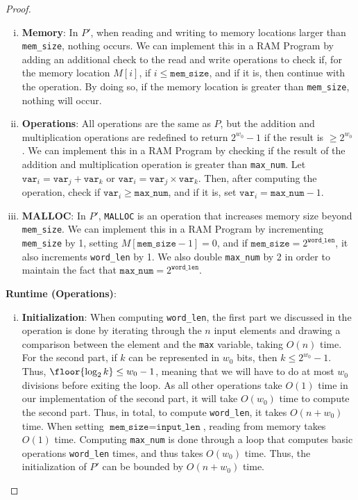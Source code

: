 \documentclass[11pt]{scrartcl}
\theoremstyle{dotlessP}
\theoremstyle{dotlessN}
\begin{document}
\begin{proof}
\begin{enumerate}[(i)]
		\item \textbf{Memory}: In $P'$, when reading and writing to memory locations larger than \texttt{mem\_size}, nothing occurs. We can implement this in a RAM Program by adding an additional check to the read and write operations to check if, for the memory location $M[i]$, if  $i \leq \texttt{mem\_size}$, and if it is, then continue with the operation. By doing so, if the memory location is greater than \texttt{mem\_size}, nothing will occur.
		\item \textbf{Operations}: All operations are the same as $P$, but the addition and multiplication operations are redefined to return $2^{w_0} - 1$ if the result is $\geq 2^{w_0}$. We can implement this in a RAM Program by checking if the result of the addition and multiplication operation is greater than \texttt{max\_num}. Let $\texttt{var}_i = \texttt{var}_j + \texttt{var}_k$ or $\texttt{var}_i = \texttt{var}_j \times \texttt{var}_k$. Then, after computing the operation, check if $\texttt{var}_i \geq \texttt{max\_num}$, and if it is, set $\texttt{var}_i = \texttt{max\_num} - 1$.
		\item \textbf{MALLOC}: In $P'$, \texttt{MALLOC} is an operation that increases memory size beyond \texttt{mem\_size}. We can implement this in a RAM Program by incrementing \texttt{mem\_size} by 1, setting $M[\texttt{mem\_size} - 1] = 0$, and if $\texttt{mem\_size} = 2^{\texttt{word\_len}}$, it also increments \texttt{word\_len} by 1. We also double \texttt{max\_num} by 2 in order to maintain the fact that $\texttt{max\_num} = 2^{\texttt{word\_len}}$.
\end{enumerate}
			\textbf{Runtime (Operations)}: 
			\begin{enumerate}[(i)]
				\item \textbf{Initialization}:
					When computing \texttt{word\_len}, the first part we discussed in the operation is done by iterating through the $n$ input elements and drawing a comparison between the element and the \texttt{max} variable, taking $O(n)$ time. For the second part, if  $k$ can be represented in $w_0$ bits, then $k \leq 2^{w_0} - 1$. Thus,  $\floor{\log_2 k} \leq w_0 - 1$, meaning that we will have to do at most $w_0$ divisions before exiting the loop. As all other operations take $O(1)$ time in our implementation of the second part, it will take $O(w_0)$ time to compute the second part. Thus, in total, to compute \texttt{word\_len}, it takes $O(n + w_0)$ time. When setting $\texttt{mem\_size} = \texttt{input\_len}$, reading from memory takes  $O(1)$ time. Computing \texttt{max\_num} is done through a loop that computes basic operations \texttt{word\_len} times, and thus takes $O(w_0)$ time. Thus, the initialization of $P'$ can be bounded by  $O(n + w_0)$ time.

\end{enumerate}
\end{proof}
\end{document}
